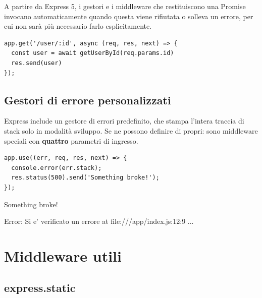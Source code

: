 A partire da Express 5, i gestori e i middleware che restituiscono una Promise
invocano automaticamente  quando questa viene rifiutata o
solleva un errore, per cui non sarà più necessario farlo esplicitamente.

\begin{lstlisting}[style=js]
app.get('/user/:id', async (req, res, next) => {
  const user = await getUserById(req.params.id)
  res.send(user)
});
\end{lstlisting}

\subsection{Gestori di errore personalizzati}

Express include un gestore di errori predefinito, che stampa l'intera traccia di
stack solo in modalità sviluppo. Se ne possono definire di propri: sono
middleware speciali con \textbf{quattro} parametri di ingresso.

\begin{affianco}[0.5][c]
\begin{lstlisting}[style=js, name=error-handler.js]
app.use((err, req, res, next) => {
  console.error(err.stack);
  res.status(500).send('Something broke!');
});
\end{lstlisting}
\risultato
\begin{browser}
  Something broke!
\end{browser}
\begin{console}
Error: Si e' verificato un errore
    at file:///app/index.js:12:9
    ...
\end{console}
\end{affianco}


\section{Middleware utili}

\subsection{express.static}

